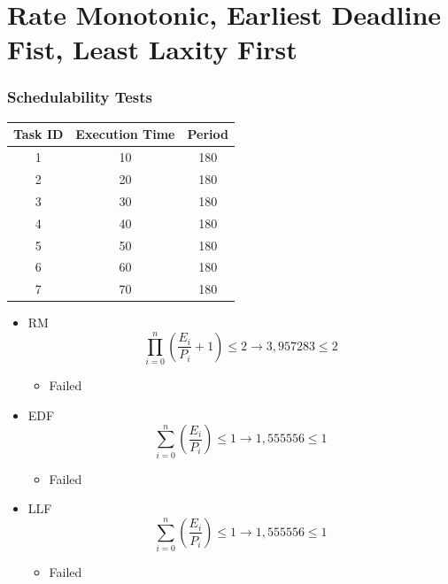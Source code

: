 \documentclass[xcolor=table]{beamer}
\begin{document}
\section{Rate Monotonic, Earliest Deadline Fist, Least Laxity First}
\begin{frame}
\frametitle{Schedulability Tests}
\begin{table}[]
\begin{tabular}{|c|c|c|}
\hline
\textbf{Task ID} & \textbf{Execution Time} & \textbf{Period}\\ \hline
\cellcolor[HTML]{ECF6CE}1 &\cellcolor[HTML]{ECF6CE}10 &\cellcolor[HTML]{ECF6CE}180 \\ \hline
\cellcolor[HTML]{A4A4A4}2 &\cellcolor[HTML]{A4A4A4}20 &\cellcolor[HTML]{A4A4A4}180 \\ \hline
\cellcolor[HTML]{F781D8}3 &\cellcolor[HTML]{F781D8}30 &\cellcolor[HTML]{F781D8}180 \\ \hline
\cellcolor[HTML]{8181F7}4 &\cellcolor[HTML]{8181F7}40 &\cellcolor[HTML]{8181F7}180 \\ \hline
\cellcolor[HTML]{80FF00}5 &\cellcolor[HTML]{80FF00}50 &\cellcolor[HTML]{80FF00}180 \\ \hline
\cellcolor[HTML]{F4FA58}6 &\cellcolor[HTML]{F4FA58}60 &\cellcolor[HTML]{F4FA58}180 \\ \hline
\cellcolor[HTML]{A9D0F5}7 &\cellcolor[HTML]{A9D0F5}70 &\cellcolor[HTML]{A9D0F5}180 \\ \hline
\end{tabular}
\end{table}
\end{frame}
\begin{frame}
\begin{itemize}
\item RM
\begin{equation}
\prod_{i=0}^{n} \left( \frac{E_i}{P_i}+1 \right) \leq 2 \rightarrow3,957283 \leq 2
\end{equation}
\begin{itemize}
\item Failed\end{itemize}
\item EDF
\begin{equation}
\sum_{i=0}^{n} \left( \frac{E_i}{P_i} \right) \leq 1 \rightarrow1,555556 \leq 1
\end{equation}
\begin{itemize}
\item Failed\end{itemize}
\item LLF
\begin{equation}
\sum_{i=0}^{n} \left( \frac{E_i}{P_i} \right) \leq 1 \rightarrow1,555556 \leq 1
\end{equation}
\begin{itemize}
\item Failed\end{itemize}
\end{itemize}
\end{frame}
\end{document}
